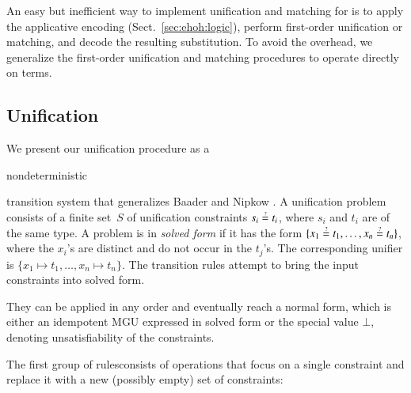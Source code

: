An easy but inefficient way to implement unification and matching for \lfhol{}
is to apply the applicative encoding (Sect.~\ref{sec:ehoh:logic}), perform
first-order unification or matching, and decode the resulting
substitution. To avoid the overhead, we generalize the first-order unification
and matching procedures to operate directly on \lfhol{} terms.

\subsection{Unification}
We present our unification procedure as a \begin{rep}nondeterministic \end{rep}transition system
that generalizes Baader and Nipkow \cite{bn-98-tr-and-all-that}.
A unification problem consists of a finite set~$\mathit{S}$ of unification constraints $s_i
\unif t_i$, where $s_i$ and $t_i$ are of the same type.
A problem is in \emph{solved form} if it has the form $\{ x_1 \unif t_1,\allowbreak
\ldots, x_n \unif t_n \}$, where the $x_i$'s are distinct and do not occur in
the $t_j$'s. The corresponding unifier is
$\{ x_1 \mapsto t_1,\allowbreak \ldots, x_n \mapsto t_n \}.$
%
The transition rules attempt to bring the input constraints into solved form.
\begin{rep}They can be applied in any order and eventually reach a normal form, which is
either an idempotent MGU expressed in solved form or the special
value $\bot$, denoting unsatisfiability of the constraints.\end{rep}

The first group of rulesconsists
of operations that focus on a single constraint and replace it with a new
(possibly empty) set of constraints:

